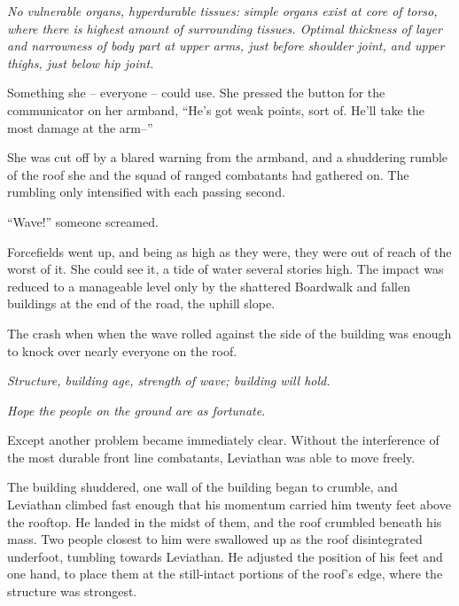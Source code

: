 \emph{No vulnerable organs, hyperdurable tissues: simple organs exist at core of torso, where there is highest amount of surrounding tissues.  Optimal thickness of layer and narrowness of body part at upper arms, just before shoulder joint, and upper thighs, just below hip joint.}



Something she – everyone – could use.  She pressed the button for the communicator on her armband, ``He's got weak points, sort of.  He'll take the most damage at the arm--''



She was cut off by a blared warning from the armband, and a shuddering rumble of the roof she and the squad of ranged combatants had gathered on.  The rumbling only intensified with each passing second.



``Wave!'' someone screamed.



Forcefields went up, and being as high as they were, they were out of reach of the worst of it.  She could see it, a tide of water several stories high.  The impact was reduced to a manageable level  only by the shattered Boardwalk and fallen buildings at the end of the road, the uphill slope.



The crash when when the wave rolled against the side of the building was enough to knock over nearly everyone on the roof.



\emph{Structure, building age, strength of wave; building will hold.}



\emph{Hope the people on the ground are as fortunate}.



Except another problem became immediately clear.  Without the interference of the most durable front line combatants, Leviathan was able to move freely.



The building shuddered, one wall of the building began to crumble, and Leviathan climbed fast enough that his momentum carried him twenty feet above the rooftop.  He landed in the midst of them, and the roof crumbled beneath his mass.  Two people closest to him were swallowed up as the roof disintegrated underfoot, tumbling towards Leviathan.  He adjusted the position of his feet and one hand, to place them at the still-intact portions of the roof's edge, where the structure was strongest.



